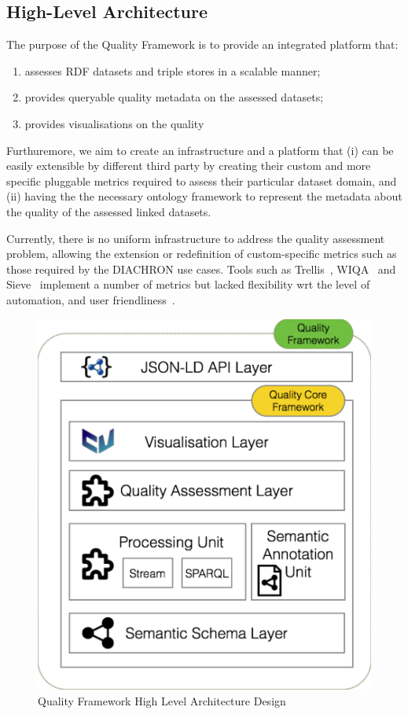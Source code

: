 
\subsection{High-Level Architecture}
\label{sec:HLA} 

The purpose of the Quality Framework is to provide an integrated platform that: 
\begin{enumerate}
\item assesses RDF datasets and triple stores in a scalable manner;
\item provides queryable quality metadata on the assessed datasets;
\item provides visualisations on the quality 
\end{enumerate}
Furthuremore, we aim to create an infrastructure and a platform that (i) can be easily extensible by different third party by creating their custom and more specific pluggable metrics required to assess their particular dataset domain, and (ii) having the the necessary ontology framework to represent the metadata about the quality of the assessed linked datasets.

Currently, there is no uniform infrastructure to address the quality assessment problem, allowing the extension or redefinition of custom-specific metrics such as those required by the DIACHRON use cases.
Tools such as Trellis~\cite{Gil2002}, WIQA~\cite{Bizer2008:PhDThesis:biblatex} and Sieve~\cite{Mendes2012} implement a number of metrics but lacked flexibility wrt the level of automation, and user friendliness~\cite{Zaveri2013}. 

\begin{figure}[tbph]
\center
\includegraphics[scale=0.3]{images/qualityFrameworkHLA.pdf} 
\caption{Quality Framework High Level Architecture Design} 
\label{fig:qualityFramework}
\end{figure}

